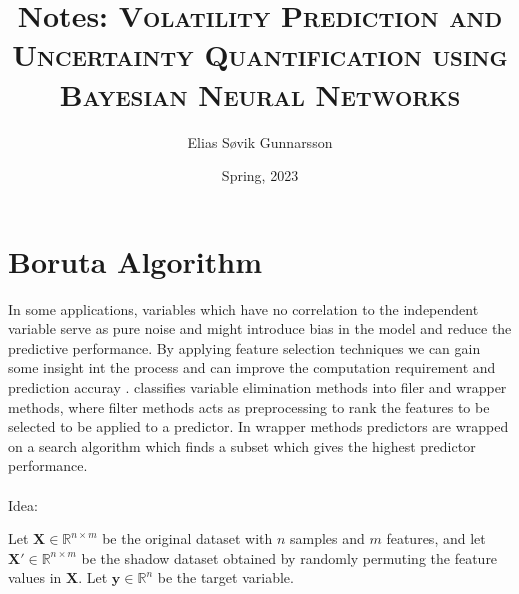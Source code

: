 \documentclass[letterpaper,10pt]{article}
\begin{document}
\title{Notes:
{\textsc{Volatility Prediction and Uncertainty Quantification using Bayesian Neural Networks}}}
\author{ Elias Søvik Gunnarsson }
\date{Spring, 2023}
\maketitle
\def\refname{Bibliography}




\section*{Boruta Algorithm}
In some applications, variables which have no correlation to the independent variable serve as pure noise and might introduce bias in the model and reduce the predictive performance. By applying feature selection techniques we can gain some insight int the process and can improve the computation requirement and prediction accuray \cite{Chandrashekar_2014}.  classifies variable elimination methods into filer and wrapper methods, where filter methods acts as preprocessing to rank the features to be selected to be applied to a predictor. In wrapper methods predictors are wrapped on a search algorithm which finds a subset which gives the highest predictor performance. 
\\\\
Idea:

Let $\boldsymbol{X} \in \mathbb{R}^{n \times m}$ be the original dataset with $n$ samples and $m$ features, and let $\boldsymbol{X'} \in \mathbb{R}^{n \times m}$ be the shadow dataset obtained by randomly permuting the feature values in $\boldsymbol{X}$. Let $\boldsymbol{y} \in \mathbb{R}^n$ be the target variable.
\end{document}
